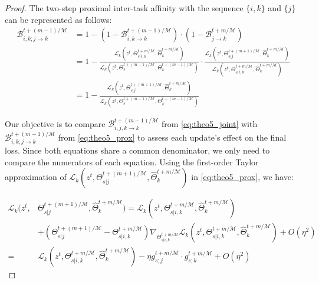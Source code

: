 \begin{proof}
The two-step proximal inter-task affinity with the sequence $\{i, k\}$ and $\{j\}$ can be represented as follows:
\begin{align}
    \mathcal{B}_{i,k; j \rightarrow k}^{t+(m-1)/\mathcal{M}} &= 1-(1-\mathcal{B}_{i,k \rightarrow k}^{t+(m-1)/\mathcal{M}}) \cdot (1-\mathcal{B}_{j\rightarrow k}^{t+m/\mathcal{M}})\\ 
    &= 1-\frac{\mathcal{L}_k(z^t, \Theta_{s|i,k}^{t+m/\mathcal{M}}, \hat{\Theta}_k^{t+m/\mathcal{M}})}{\mathcal{L}_k(z^t, \Theta_{s}^{t+(m-1)/\mathcal{M}}, \Theta_k^{t+(m-1)/\mathcal{M}})} \cdot \frac{\mathcal{L}_k(z^t, \Theta_{s|j}^{t+(m+1)/\mathcal{M}}, \hat{\Theta}_k^{t+m/\mathcal{M}})}{\mathcal{L}_k(z^t, \Theta_{s|i,k}^{t+m/\mathcal{M}}, \hat{\Theta}_k^{t+m/\mathcal{M}})}\\
    &= 1-\frac{\mathcal{L}_k(z^t, \Theta_{s|j}^{t+(m+1)/\mathcal{M}}, \hat{\Theta}_k^{t+m/\mathcal{M}})}{\mathcal{L}_k(z^t, \Theta_{s}^{t+(m-1)/\mathcal{M}}, \Theta_k^{t+(m-1)/\mathcal{M}})} \label{eq:theo5_prox}
\end{align}

Our objective is to compare $\mathcal{B}_{i,j,k \rightarrow k}^{t+(m-1)/\mathcal{M}}$ from \cref{eq:theo5_joint} with $\mathcal{B}_{i,k; j \rightarrow k}^{t+(m-1)/\mathcal{M}}$ from \cref{eq:theo5_prox} to assess each update's effect on the final loss. Since both equations share a common denominator, we only need to compare the numerators of each equation. Using the first-order Taylor approximation of $\mathcal{L}_k(z^t, \Theta_{s|j}^{t+(m+1)/\mathcal{M}}, \hat{\Theta}_k^{t+m/\mathcal{M}})$ in \cref{eq:theo5_prox}, we have:

\begin{align}
    \mathcal{L}_k(z^t, &\Theta_{s|j}^{t+(m+1)/\mathcal{M}}, \hat{\Theta}_k^{t+m/\mathcal{M}}) = \mathcal{L}_k (z^t, \Theta_{s|i,k}^{t+m/\mathcal{M}}, \hat{\Theta}_k^{t+m/\mathcal{M}}) \label{eq:theo5_middle1}\\
    &+(\Theta_{s|j}^{t+(m+1)/\mathcal{M}} - \Theta_{s|i,k}^{t+m/\mathcal{M}}) \nabla_{\Theta_{s|i,k}^{t+m/\mathcal{M}}} \mathcal{L}_k (z^t, \Theta_{s|i,k}^{t+m/\mathcal{M}}, \hat{\Theta}_k^{t+m/\mathcal{M}}) + O(\eta^2)\\
    =& \mathcal{L}_k (z^t, \Theta_{s|i,k}^{t+m/\mathcal{M}}, \hat{\Theta}_k^{t+m/\mathcal{M}}) - \eta g_{s;j}^{t+m/\mathcal{M}}\cdot g_{s;k}^{t+m/\mathcal{M}} + O(\eta^2)
\end{align}


\end{proof}
